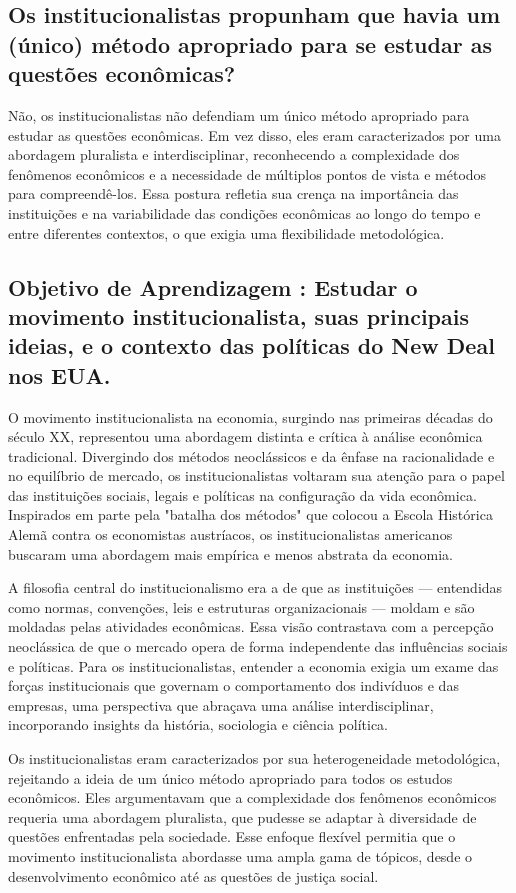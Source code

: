 \documentclass[a4paper,12pt]{article}[abntex2]
\begin{document}
\subsection{\textbf{Os institucionalistas propunham que havia um (único) método apropriado para se estudar as questões econômicas?}}
Não, os institucionalistas não defendiam um único método apropriado para estudar as questões econômicas. Em vez disso, eles eram caracterizados por uma abordagem pluralista e interdisciplinar, reconhecendo a complexidade dos fenômenos econômicos e a necessidade de múltiplos pontos de vista e métodos para compreendê-los. Essa postura refletia sua crença na importância das instituições e na variabilidade das condições econômicas ao longo do tempo e entre diferentes contextos, o que exigia uma flexibilidade metodológica.
\subsection{\textbf{Objetivo de Aprendizagem : Estudar o movimento institucionalista, suas principais ideias, e o contexto das políticas do New Deal nos EUA.}}
O movimento institucionalista na economia, surgindo nas primeiras décadas do século XX, representou uma abordagem distinta e crítica à análise econômica tradicional. Divergindo dos métodos neoclássicos e da ênfase na racionalidade e no equilíbrio de mercado, os institucionalistas voltaram sua atenção para o papel das instituições sociais, legais e políticas na configuração da vida econômica. Inspirados em parte pela "batalha dos métodos" que colocou a Escola Histórica Alemã contra os economistas austríacos, os institucionalistas americanos buscaram uma abordagem mais empírica e menos abstrata da economia.

A filosofia central do institucionalismo era a de que as instituições — entendidas como normas, convenções, leis e estruturas organizacionais — moldam e são moldadas pelas atividades econômicas. Essa visão contrastava com a percepção neoclássica de que o mercado opera de forma independente das influências sociais e políticas. Para os institucionalistas, entender a economia exigia um exame das forças institucionais que governam o comportamento dos indivíduos e das empresas, uma perspectiva que abraçava uma análise interdisciplinar, incorporando insights da história, sociologia e ciência política.

Os institucionalistas eram caracterizados por sua heterogeneidade metodológica, rejeitando a ideia de um único método apropriado para todos os estudos econômicos. Eles argumentavam que a complexidade dos fenômenos econômicos requeria uma abordagem pluralista, que pudesse se adaptar à diversidade de questões enfrentadas pela sociedade. Esse enfoque flexível permitia que o movimento institucionalista abordasse uma ampla gama de tópicos, desde o desenvolvimento econômico até as questões de justiça social.
\end{document}
